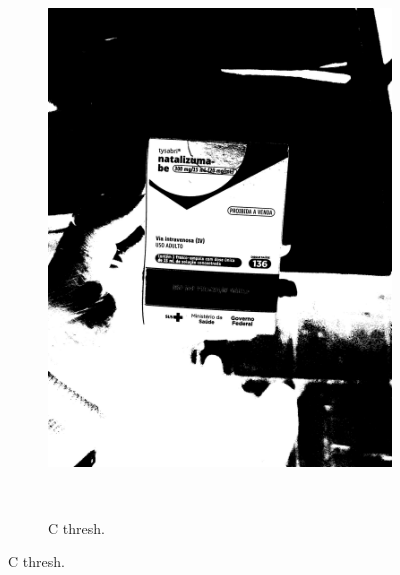 \begin{figure}[htb]
\begin{subfigure}[t]{0.21\textwidth}
        \includegraphics[width=\linewidth]{../pictures/tysabri_cmyk_k_only_thresh.jpg}
    \end{subfigure}
    \\\vspace{\floatsep}
    \begin{subfigure}[t]{0.21\textwidth}
        \centering
        \caption{C thresh.}
        \label{fig:foto:versoes:2:C_thresh:boxes}

\end{subfigure}
\end{figure}
